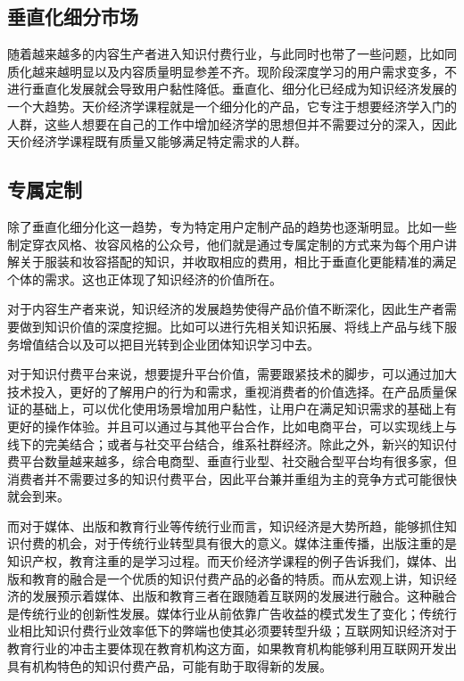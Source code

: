 \documentclass[UTF8,a4paper,12pt]{ctexart}  %
\renewcommand{\refname}{参考文献}            %
\begin{document}
\hypertarget{section-18}{%
\subsection{垂直化细分市场}\label{section-18}}

随着越来越多的内容生产者进入知识付费行业，与此同时也带了一些问题，比如同质化越来越明显以及内容质量明显参差不齐。现阶段深度学习的用户需求变多，不进行垂直化发展就会导致用户黏性降低。垂直化、细分化已经成为知识经济发展的一个大趋势。天价经济学课程就是一个细分化的产品，它专注于想要经济学入门的人群，这些人想要在自己的工作中增加经济学的思想但并不需要过分的深入，因此天价经济学课程既有质量又能够满足特定需求的人群。

\hypertarget{section-19}{%
\subsection{专属定制}\label{section-19}}

除了垂直化细分化这一趋势，专为特定用户定制产品的趋势也逐渐明显。比如一些制定穿衣风格、妆容风格的公众号，他们就是通过专属定制的方式来为每个用户讲解关于服装和妆容搭配的知识，并收取相应的费用，相比于垂直化更能精准的满足个体的需求。这也正体现了知识经济的价值所在。

对于内容生产者来说，知识经济的发展趋势使得产品价值不断深化，因此生产者需要做到知识价值的深度挖掘。比如可以进行先相关知识拓展、将线上产品与线下服务增值结合以及可以把目光转到企业团体知识学习中去。

对于知识付费平台来说，想要提升平台价值，需要跟紧技术的脚步，可以通过加大技术投入，更好的了解用户的行为和需求，重视消费者的价值选择。在产品质量保证的基础上，可以优化使用场景增加用户黏性，让用户在满足知识需求的基础上有更好的操作体验。并且可以通过与其他平台合作，比如电商平台，可以实现线上与线下的完美结合；或者与社交平台结合，维系社群经济。除此之外，新兴的知识付费平台数量越来越多，综合电商型、垂直行业型、社交融合型平台均有很多家，但消费者并不需要过多的知识付费平台，因此平台兼并重组为主的竞争方式可能很快就会到来。

而对于媒体、出版和教育行业等传统行业而言，知识经济是大势所趋，能够抓住知识付费的机会，对于传统行业转型具有很大的意义。媒体注重传播，出版注重的是知识产权，教育注重的是学习过程。而天价经济学课程的例子告诉我们，媒体、出版和教育的融合是一个优质的知识付费产品的必备的特质。而从宏观上讲，知识经济的发展预示着媒体、出版和教育三者在跟随着互联网的发展进行融合。这种融合是传统行业的创新性发展。媒体行业从前依靠广告收益的模式发生了变化；传统行业相比知识付费行业效率低下的弊端也使其必须要转型升级；互联网知识经济对于教育行业的冲击主要体现在教育机构这方面，如果教育机构能够利用互联网开发出具有机构特色的知识付费产品，可能有助于取得新的发展。



\renewcommand\refname{参考文献}
\pdfbookmark{\refname}{reference}


\end{document}
